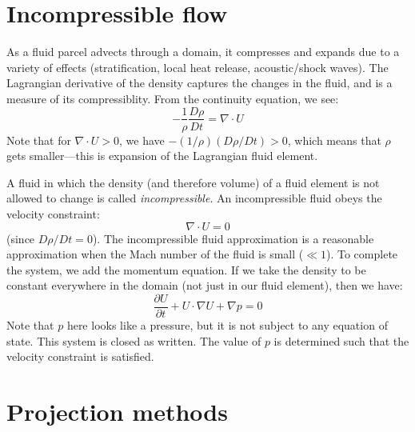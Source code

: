 \label{ch:incompressible}

\begin{quote}
\end{quote}

\section{Incompressible flow}

As a fluid parcel advects through a domain, it compresses and expands
due to a variety of effects (stratification, local heat release,
acoustic/shock waves).  The Lagrangian derivative of the density
captures the changes in the fluid, and is a measure of its compressiblity.
From the continuity equation, we see:
\begin{equation}
-\frac{1}{\rho}\frac{D\rho}{Dt} = \nabla \cdot U
\end{equation}
Note that for $\nabla \cdot U > 0$, we have $-(1/\rho) (D\rho/Dt) > 0$,
which means that $\rho$ gets smaller---this is expansion of the Lagrangian
fluid element.

A fluid in which the density (and therefore volume) of a fluid element is not
allowed to change is called {\em incompressible}.  An incompressible
fluid obeys the velocity constraint:
\begin{equation}
\nabla \cdot U = 0
\end{equation}
(since $D\rho / Dt = 0$).  The incompressible fluid approximation is 
a reasonable approximation when the Mach number of the fluid is small
($\ll 1$).  To complete the system, we add the momentum equation.  If 
we take the density to be constant everywhere in the domain (not just
in our fluid element), then we have:
\begin{equation}
\frac{\partial U}{\partial t} + U \cdot \nabla U + \nabla p = 0
\end{equation}
Note that $p$ here looks like a pressure, but it is not subject to
any equation of state.  This system is closed as written.  The value
of $p$ is determined such that the velocity constraint is satisfied.



\section{Projection methods}

